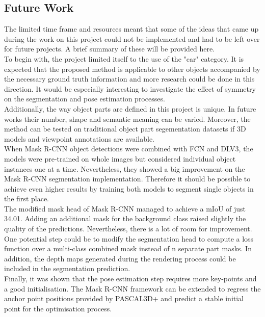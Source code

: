 \documentclass[main.tex]{subfiles}
\begin{document}
\subsection{Future Work}
The limited time frame and resources meant that some of the ideas that came up during the work on this project could not be implemented and had to be left over for future projects. A brief summary of these will be provided here.\\
\indent To begin with, the project limited itself to the use of the "car" category. It is expected that the proposed method is applicable to other objects accompanied by the necessary ground truth information and more research could be done in this direction. It would be especially interesting to investigate the effect of symmetry on the segmentation and pose estimation processes. \\
\indent Additionally, the way object parts are defined in this project is unique. In future works their number, shape and semantic meaning can be varied. Moreover, the method can be tested on traditional object part segementation datasets if 3D models and viewpoint annotations are available.\\
\indent  When Mask R-CNN object detections were combined with FCN and DLV3, the models were pre-trained on whole images but considered individual object instances one at a time. Nevertheless, they showed a big improvement on the Mask R-CNN segmentation implementation. Therefore it should be possible to achieve even higher results by training both models to segment single objects in the first place.\\
\indent The modified mask head of Mask R-CNN managed to achieve a mIoU of just 34.01. Adding an additional mask for the background class raised slightly the quality of the predictions. Nevertheless, there is a lot of room for improvement. One potential step could be to modify the segmentation head to compute a loss function over a multi-class combined mask instead of n separate part masks. In addition, the depth maps generated during the rendering process could be included in the segmentation prediction.\\
\indent Finally, it was shown that the pose estimation step requires more key-points and a good initialisation. The Mask R-CNN framework can be extended to regress the anchor point positions provided by PASCAL3D+ and predict a stable initial point for the optimisation process.
\end{document}
